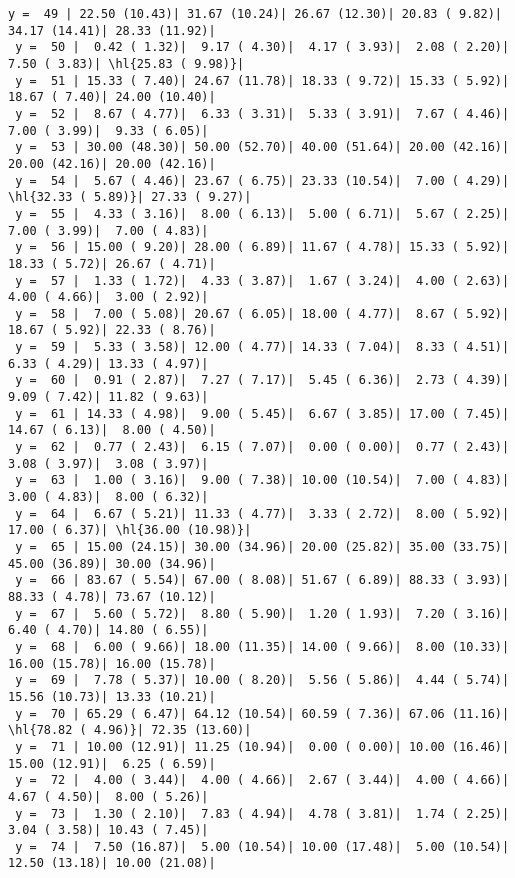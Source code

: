 \documentclass[10pt]{article}
\newcommand{\hl}[1]{\textbf{\textcolor{red}{#1}}}
\begin{document}
\begin{Verbatim}[fontsize=\small, commandchars=\\\{\}]
 y =  49 | 22.50 (10.43)| 31.67 (10.24)| 26.67 (12.30)| 20.83 ( 9.82)| 34.17 (14.41)| 28.33 (11.92)|
 y =  50 |  0.42 ( 1.32)|  9.17 ( 4.30)|  4.17 ( 3.93)|  2.08 ( 2.20)|  7.50 ( 3.83)| \hl{25.83 ( 9.98)}|
 y =  51 | 15.33 ( 7.40)| 24.67 (11.78)| 18.33 ( 9.72)| 15.33 ( 5.92)| 18.67 ( 7.40)| 24.00 (10.40)|
 y =  52 |  8.67 ( 4.77)|  6.33 ( 3.31)|  5.33 ( 3.91)|  7.67 ( 4.46)|  7.00 ( 3.99)|  9.33 ( 6.05)|
 y =  53 | 30.00 (48.30)| 50.00 (52.70)| 40.00 (51.64)| 20.00 (42.16)| 20.00 (42.16)| 20.00 (42.16)|
 y =  54 |  5.67 ( 4.46)| 23.67 ( 6.75)| 23.33 (10.54)|  7.00 ( 4.29)| \hl{32.33 ( 5.89)}| 27.33 ( 9.27)|
 y =  55 |  4.33 ( 3.16)|  8.00 ( 6.13)|  5.00 ( 6.71)|  5.67 ( 2.25)|  7.00 ( 3.99)|  7.00 ( 4.83)|
 y =  56 | 15.00 ( 9.20)| 28.00 ( 6.89)| 11.67 ( 4.78)| 15.33 ( 5.92)| 18.33 ( 5.72)| 26.67 ( 4.71)|
 y =  57 |  1.33 ( 1.72)|  4.33 ( 3.87)|  1.67 ( 3.24)|  4.00 ( 2.63)|  4.00 ( 4.66)|  3.00 ( 2.92)|
 y =  58 |  7.00 ( 5.08)| 20.67 ( 6.05)| 18.00 ( 4.77)|  8.67 ( 5.92)| 18.67 ( 5.92)| 22.33 ( 8.76)|
 y =  59 |  5.33 ( 3.58)| 12.00 ( 4.77)| 14.33 ( 7.04)|  8.33 ( 4.51)|  6.33 ( 4.29)| 13.33 ( 4.97)|
 y =  60 |  0.91 ( 2.87)|  7.27 ( 7.17)|  5.45 ( 6.36)|  2.73 ( 4.39)|  9.09 ( 7.42)| 11.82 ( 9.63)|
 y =  61 | 14.33 ( 4.98)|  9.00 ( 5.45)|  6.67 ( 3.85)| 17.00 ( 7.45)| 14.67 ( 6.13)|  8.00 ( 4.50)|
 y =  62 |  0.77 ( 2.43)|  6.15 ( 7.07)|  0.00 ( 0.00)|  0.77 ( 2.43)|  3.08 ( 3.97)|  3.08 ( 3.97)|
 y =  63 |  1.00 ( 3.16)|  9.00 ( 7.38)| 10.00 (10.54)|  7.00 ( 4.83)|  3.00 ( 4.83)|  8.00 ( 6.32)|
 y =  64 |  6.67 ( 5.21)| 11.33 ( 4.77)|  3.33 ( 2.72)|  8.00 ( 5.92)| 17.00 ( 6.37)| \hl{36.00 (10.98)}|
 y =  65 | 15.00 (24.15)| 30.00 (34.96)| 20.00 (25.82)| 35.00 (33.75)| 45.00 (36.89)| 30.00 (34.96)|
 y =  66 | 83.67 ( 5.54)| 67.00 ( 8.08)| 51.67 ( 6.89)| 88.33 ( 3.93)| 88.33 ( 4.78)| 73.67 (10.12)|
 y =  67 |  5.60 ( 5.72)|  8.80 ( 5.90)|  1.20 ( 1.93)|  7.20 ( 3.16)|  6.40 ( 4.70)| 14.80 ( 6.55)|
 y =  68 |  6.00 ( 9.66)| 18.00 (11.35)| 14.00 ( 9.66)|  8.00 (10.33)| 16.00 (15.78)| 16.00 (15.78)|
 y =  69 |  7.78 ( 5.37)| 10.00 ( 8.20)|  5.56 ( 5.86)|  4.44 ( 5.74)| 15.56 (10.73)| 13.33 (10.21)|
 y =  70 | 65.29 ( 6.47)| 64.12 (10.54)| 60.59 ( 7.36)| 67.06 (11.16)| \hl{78.82 ( 4.96)}| 72.35 (13.60)|
 y =  71 | 10.00 (12.91)| 11.25 (10.94)|  0.00 ( 0.00)| 10.00 (16.46)| 15.00 (12.91)|  6.25 ( 6.59)|
 y =  72 |  4.00 ( 3.44)|  4.00 ( 4.66)|  2.67 ( 3.44)|  4.00 ( 4.66)|  4.67 ( 4.50)|  8.00 ( 5.26)|
 y =  73 |  1.30 ( 2.10)|  7.83 ( 4.94)|  4.78 ( 3.81)|  1.74 ( 2.25)|  3.04 ( 3.58)| 10.43 ( 7.45)|
 y =  74 |  7.50 (16.87)|  5.00 (10.54)| 10.00 (17.48)|  5.00 (10.54)| 12.50 (13.18)| 10.00 (21.08)|

\end{Verbatim}
\end{document}
